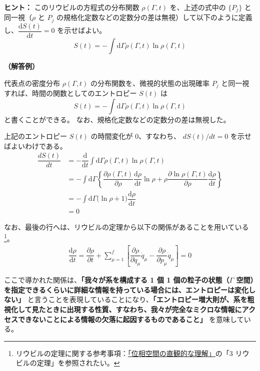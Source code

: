 \documentclass[uplatex,dvipdfmx,a4paper,11pt]{jsarticle}
\newcommand{\diff}{\mathrm d}
\newcommand{\difd}[2]{\dfrac{\diff #1}{\diff #2}}
\newcommand{\difp}[2]{\dfrac{\partial #1}{\partial #2}}
\begin{document}
\begin{enumerate}
\begin{itembox}[l]{{\bf ヒント：}}
このリウビルの方程式の分布関数 $\rho(\Gamma, t)$ を、上述の式中の $\{ P_j \}$ と同一視（$\rho$ と $P_j$ の規格化定数などの定数分の差は無視）して以下のように定義し、$\difd{S(t)}{t} = 0$ を示せばよい。
\begin{equation*}
	S(t) = - \int \diff \Gamma \rho(\Gamma,t) \ln \rho(\Gamma, t)
\end{equation*}

\end{itembox}

\vspace{8pt}

{\bf （解答例）}

代表点の密度分布 $\rho(\Gamma,t)$ の分布関数を、微視的状態の出現確率 $P_j$ と同一視すれば、時間の関数としてのエントロピー $S(t)$ は
\begin{equation*}
	S(t) = - \int \diff \Gamma \rho(\Gamma,t) \ln \rho(\Gamma, t)
\end{equation*}
と書くことができる。
なお、規格化定数などの定数分の差は無視した。

上記のエントロピー $S(t)$ の時間変化が $0$、すなわち、 $dS(t)/dt = 0$ を示せばよいわけである。
\begin{align*}
\dfrac{d S(t)}{dt} 
	&= - \difd{}{t} \int \diff \Gamma \rho(\Gamma,t) \ln \rho(\Gamma, t) \\
	&= - \int \diff \Gamma 
		\left\{ 
			\difp{\rho(\Gamma,t)}{\rho} \difd{\rho}{t} \ln \rho 
			+ \rho \difp{\ln \rho(\Gamma,t)}{\rho} \difd{\rho}{t} 
		\right\} \\
	&= - \int \diff \Gamma \big( \ln \rho + 1 \big)\difd{\rho}{t} \\
	&= 0
\end{align*}

なお、最後の行へは、リウビルの定理から以下の関係があることを用いている
\footnote{
リウビルの定理に関する参考事項：\href{http://kisokouza.island.ac/documents/Phase_Space.pdf}{「位相空間の直観的な理解」}の「3 リウビルの定理」を参照されたい。
}。
\begin{align*}
\difd{\rho}{t} 
=
\difp{\rho}{t} 
+ \sum_{\mu = 1}^{f} 
	\left[
		\difp{\rho}{q_{\mu}}\dot{q}_{\mu}
		- \difp{\rho}{p_{\mu}}\dot{q}_{\mu}
	\right]
= 0
\end{align*}

ここで導かれた関係は、\textbf{「我々が系を構成する 1 個 1 個の粒子の状態（$\Gamma$ 空間）を指定できるくらいに詳細な情報を持っている場合には、エントロピーは変化しない」} と言うことを表現していることになり、\textbf{「エントロピー増大則が、系を粗視化して見たときに出現する性質、すなわち、我々が完全なミクロな情報にアクセスできないことによる情報の欠落に起因するものであること」} を意味している。 
\color{black}

\end{enumerate}
\end{document}
